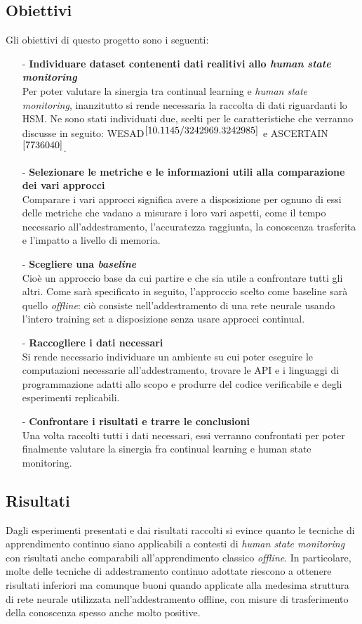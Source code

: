 \subsection*{Obiettivi}
Gli obiettivi di questo progetto sono i seguenti:
\begin{itemize}
    \item[-] \textbf{Individuare dataset contenenti dati realitivi allo \textit{human state monitoring}}\\
    Per poter valutare la sinergia tra continual learning e \textit{human state monitoring}, inanzitutto si rende necessaria la raccolta di dati riguardanti lo HSM. Ne sono stati individuati due, scelti per le caratteristiche che verranno discusse in seguito: WESAD$^{\cite{10.1145/3242969.3242985}}$ e ASCERTAIN$^{\cite{7736040}}$.
    \item[-] \textbf{Selezionare le metriche e le informazioni utili alla comparazione dei vari approcci}\\
    Comparare i vari approcci significa avere a disposizione per ognuno di essi delle metriche che vadano a misurare i loro vari aspetti, come il tempo necessario all'addestramento, l'accuratezza raggiunta, la conoscenza trasferita e l'impatto a livello di memoria.
    \item[-] \textbf{Scegliere una \textit{baseline}}\\
    Cioè un approccio base da cui partire e che sia utile a confrontare tutti gli altri. Come sarà specificato in seguito, l'approccio scelto come baseline sarà quello \textit{offline}: ciò consiste nell'addestramento di una rete neurale usando l'intero training set a disposizione senza usare approcci continual.
    \item[-] \textbf{Raccogliere i dati necessari}\\
    Si rende necessario individuare un ambiente su cui poter eseguire le computazioni necessarie all'addestramento, trovare le API e i linguaggi di programmazione adatti allo scopo e produrre del codice verificabile e degli esperimenti replicabili.
    \item[-] \textbf{Confrontare i risultati e trarre le conclusioni}\\
    Una volta raccolti tutti i dati necessari, essi verranno confrontati per poter finalmente valutare la sinergia fra continual learning e human state monitoring.
\end{itemize}

\subsection*{Risultati}
Dagli esperimenti presentati e dai risultati raccolti si evince quanto le tecniche di apprendimento continuo siano applicabili a contesti di \textit{human state monitoring} con risultati anche comparabili all'apprendimento classico \textit{offline}. In particolare, molte delle tecniche di addestramento continuo adottate riescono a ottenere risultati inferiori ma comunque buoni quando applicate alla medesima struttura di rete neurale utilizzata nell'addestramento offline, con misure di trasferimento della conoscenza spesso anche molto positive.

